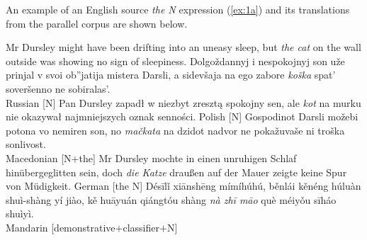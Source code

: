 \documentclass[output=paper,colorlinks,citecolor=brown]{langscibook}
\begin{document}
 

 An example of an English source \textit{the N} expression (\ref{ex:1a}) and its translations from the parallel corpus are shown below. 

\ea \label{ex:1}
\ea \label{ex:1a} Mr Dursley might have been drifting into an uneasy sleep, but \textit{the cat} on the wall outside was showing no sign of sleepiness.
\ex \label{ex:1b} Dolgo\v{z}dannyj i nespokojnyj son u\v{z}e prinjal v svoi ob''jatija mistera Darsli, a sidev\v{s}aja na ego zabore \textit{ko\v{s}ka} spat' sover\v{s}enno ne sobiralas'.\\
\hfill{Russian [N]}
\ex \label{ex:1c} Pan Dursley zapadł w niezbyt zresztą spokojny sen, ale \textit{kot} na murku 
nie okazywał najmniejszych oznak senności. \hfill{Polish [N]}
\ex \label{ex:1d} Gospodinot Darsli mo\v{z}ebi potona vo nemiren son, no \textit{ma\v{c}kata} na dzidot nadvor ne poka\v{z}uva\v{s}e ni tro\v{s}ka sonlivost.
\\ \hfill{Macedonian [N$+$the]}
\ex \label{ex:1e} Mr Dursley mochte in einen unruhigen Schlaf
hinübergeglitten sein,
doch \textit{die Katze} draußen auf der Mauer zeigte keine
Spur von
Müdigkeit. \hfill{German [the N]}
\ex \label{ex:1f} 
Désīlǐ  xiānshēng mímíhúhú, běnlái kěnéng húluàn shuì-shàng yí jiào, kě huāyuán qiángtóu shàng \textit{nà zhī māo} què méiyǒu sīháo shuìyì.\\
\hfill{Mandarin [demonstrative$+$classifier$+$N]}
\z\z
\end{document}
